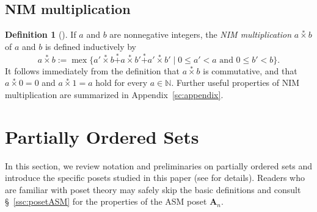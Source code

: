\documentclass[a4paper,11pt]{amsart}
\theoremstyle{definition}
\newtheorem{dfn}{Definition}[section]
\newcommand{\mex}{\operatorname{mex}}
\newcommand{\nimadd}{\overset{*}{+}}
\newcommand{\nimmul}{\overset{*}{\times}}
\numberwithin{equation}{section}
\def\Non{\mathbb{N}}
\def\ASM#1{\boldsymbol{A}_{#1}}
\begin{document}
\subsection{NIM multiplication}
%
%
\begin{dfn}[\cite{ONAG,Lenstra,Sato}]\label{def:NimMul}
%
If $a$ and $b$ are nonnegative integers,
the \textsl{NIM multiplication} $a \nimmul b$ of $a$ and $b$ is defined inductively by
\begin{equation}\label{eq:NIM-mul}
a \nimmul b 
:= 
\mex\bigl\{a' \nimmul b \nimadd a \nimmul b' \nimadd a' \nimmul b'\mid 0 \leq a' < a \text{ and } 0 \leq b' < b\bigr\}.
\end{equation}
%
It follows immediately from the definition that $a \nimmul b$ is commutative, 
and that $a \nimmul 0=0$ and $a \nimmul 1=a$ hold for every $a\in\Non$.
%
Further useful properties of NIM multiplication are summarized in Appendix~\ref{sc:appendix}.
%
%
\end{dfn}
%

%
%
%
%
%
\section{Partially Ordered Sets}\label{sec:poset}
%
In this section, we review notation and preliminaries on partially ordered sets and introduce the specific posets studied in this paper (see \cite{ec1} for details).
Readers who are familiar with poset theory may safely skip the basic definitions and consult \S~\ref{ssc:posetASM}
for the properties of the ASM poset $\ASM{n}$.

%
\end{document}
